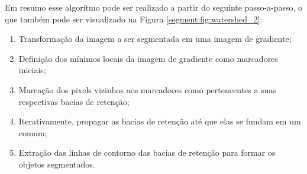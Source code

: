 Em resumo esse algoritmo pode ser realizado a partir do seguinte passo-a-passo, o que também pode ser visualizado na Figura \ref{segment:fig:watershed_2}:

\begin{enumerate}
    \item Transformação da imagem a ser segmentada em uma imagem de gradiente;
    \item Definição dos mínimos locais da imagem de gradiente como marcadores iniciais;
    \item Marcação dos pixels vizinhos aos marcadores como pertencentes a suas respectivas bacias de retenção;
    \item Iterativamente, propagar as bacias de retenção até que elas se fundam em um  comum;
    \item Extração das linhas de contorno das bacias de retenção para formar os objetos segmentados.
\end{enumerate}

